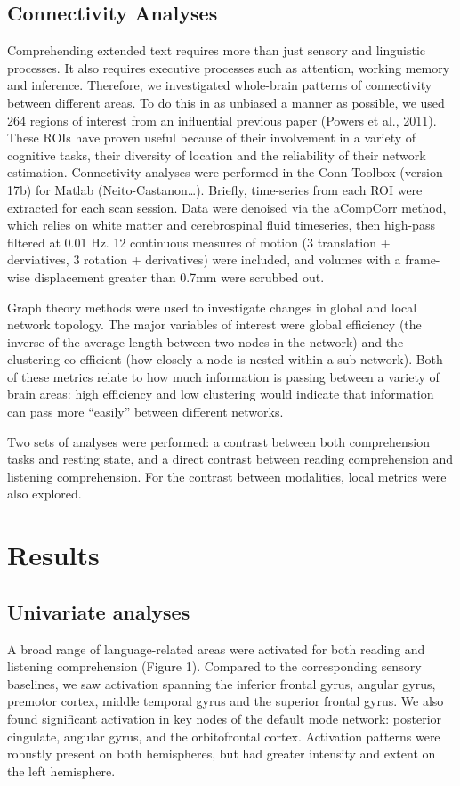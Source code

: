 \subsection{Connectivity Analyses}

Comprehending extended text requires more than just sensory and linguistic processes. It also requires executive processes such as attention, working memory and inference. Therefore, we investigated whole-brain patterns of connectivity between different areas. To do this in as unbiased a manner as possible, we used 264 regions of interest from an influential previous paper (Powers et al., 2011). These ROIs have proven useful because of their involvement in a variety of cognitive tasks, their diversity of location and the reliability of their network estimation. 
Connectivity analyses were performed in the Conn Toolbox (version 17b) for Matlab (Neito-Castanon…). Briefly, time-series from each ROI were extracted for each scan session. Data were denoised via the aCompCorr method, which relies on white matter and cerebrospinal fluid timeseries, then high-pass filtered at 0.01 Hz. 12 continuous measures of motion (3 translation + derviatives, 3 rotation + derivatives) were included, and volumes with a frame-wise displacement greater than 0.7mm were scrubbed out. 

Graph theory methods were used to investigate changes in global and local network topology. The major variables of interest were global efficiency (the inverse of the average length between two nodes in the network) and the clustering co-efficient (how closely a node is nested within a sub-network). Both of these metrics relate to how much information is passing between a variety of brain areas: high efficiency and low clustering would indicate that information can pass more “easily” between different networks. 

Two sets of analyses were performed: a contrast between both comprehension tasks and resting state, and a direct contrast between reading comprehension and listening comprehension. For the contrast between modalities, local metrics were also explored.

\section{Results}

\subsection{Univariate analyses}
A broad range of language-related areas were activated for both reading and listening comprehension (Figure 1). Compared to the corresponding sensory baselines, we saw activation spanning the inferior frontal gyrus, angular gyrus, premotor cortex, middle temporal gyrus and the superior frontal gyrus. We also found significant activation in key nodes of the default mode network: posterior cingulate, angular gyrus, and the orbitofrontal cortex. Activation patterns were robustly present on both hemispheres, but had greater intensity and extent on the left hemisphere. 

